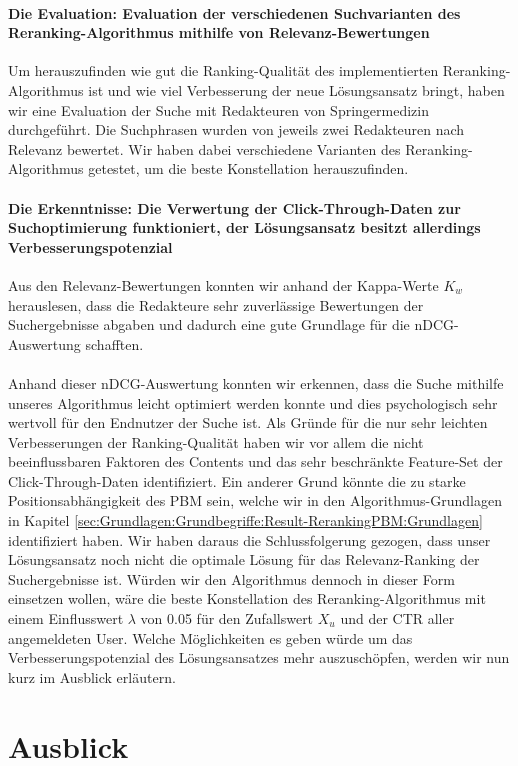 \paragraph{Die Evaluation: Evaluation der verschiedenen Suchvarianten des Reranking-Algorithmus mithilfe von Relevanz-Bewertungen}
Um herauszufinden wie gut die Ranking-Qualität des implementierten Reranking-Algorithmus ist und wie viel Verbesserung der neue Lösungsansatz bringt, haben wir eine Evaluation der Suche mit Redakteuren von Springermedizin durchgeführt. Die Suchphrasen wurden von jeweils zwei Redakteuren nach Relevanz bewertet. Wir haben dabei verschiedene Varianten des Reranking-Algorithmus getestet, um die beste Konstellation herauszufinden. 

\paragraph{Die Erkenntnisse: Die Verwertung der Click-Through-Daten zur Suchoptimierung funktioniert, der Lösungsansatz besitzt allerdings Verbesserungspotenzial}
Aus den Relevanz-Bewertungen konnten wir anhand der Kappa-Werte $K_w$ herauslesen, dass die Redakteure sehr zuverlässige Bewertungen der Suchergebnisse abgaben und dadurch eine gute Grundlage für die nDCG-Auswertung schafften.
\\
\\
Anhand dieser nDCG-Auswertung konnten wir erkennen, dass die Suche mithilfe unseres Algorithmus leicht optimiert werden konnte und dies psychologisch sehr wertvoll für den Endnutzer der Suche ist. Als Gründe für die nur sehr leichten Verbesserungen der Ranking-Qualität haben wir vor allem die nicht beeinflussbaren Faktoren des Contents und das sehr beschränkte Feature-Set der Click-Through-Daten identifiziert. Ein anderer Grund könnte die zu starke Positionsabhängigkeit des PBM sein, welche wir in den Algorithmus-Grundlagen in Kapitel \ref{sec:Grundlagen:Grundbegriffe:Result-RerankingPBM:Grundlagen} identifiziert haben. Wir haben daraus die Schlussfolgerung gezogen, dass unser Lösungsansatz noch nicht die optimale Lösung für das Relevanz-Ranking der Suchergebnisse ist. Würden wir den Algorithmus dennoch in dieser Form einsetzen wollen, wäre die beste Konstellation des Reranking-Algorithmus mit einem Einflusswert $\lambda$ von 0.05 für den Zufallswert $X_u$ und der CTR aller angemeldeten User. Welche Möglichkeiten es geben würde um das Verbesserungspotenzial des Lösungsansatzes mehr auszuschöpfen, werden wir nun kurz im Ausblick erläutern.

\section{Ausblick}
\label{sec:ZusammenfassungAusblick:Ausblick}


